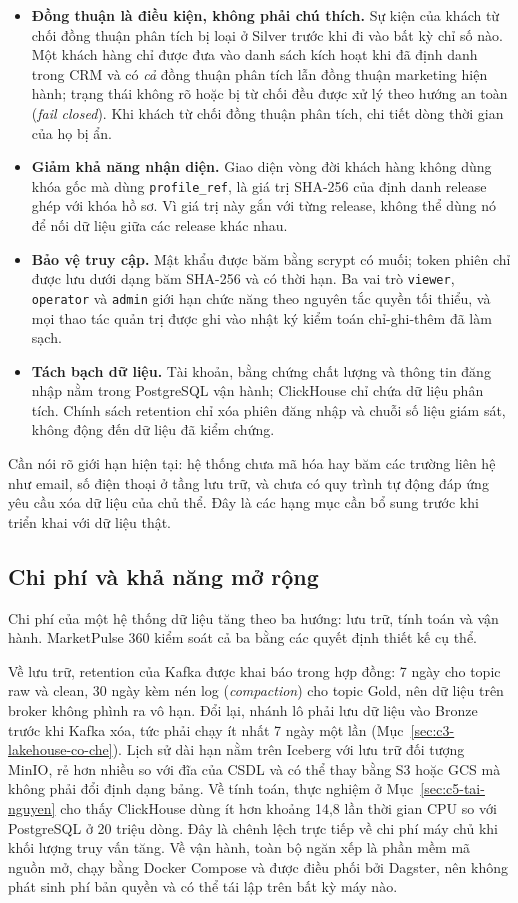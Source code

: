 \begin{itemize}
    \item \textbf{Đồng thuận là điều kiện, không phải chú thích.} Sự kiện của khách từ chối đồng thuận phân tích bị loại ở Silver trước khi đi vào bất kỳ chỉ số nào. Một khách hàng chỉ được đưa vào danh sách kích hoạt khi đã định danh trong CRM và có \emph{cả} đồng thuận phân tích lẫn đồng thuận marketing hiện hành; trạng thái không rõ hoặc bị từ chối đều được xử lý theo hướng an toàn (\emph{fail closed}). Khi khách từ chối đồng thuận phân tích, chi tiết dòng thời gian của họ bị ẩn.
    \item \textbf{Giảm khả năng nhận diện.} Giao diện vòng đời khách hàng không dùng khóa gốc mà dùng \texttt{profile\_ref}, là giá trị SHA-256 của định danh release ghép với khóa hồ sơ. Vì giá trị này gắn với từng release, không thể dùng nó để nối dữ liệu giữa các release khác nhau.
    \item \textbf{Bảo vệ truy cập.} Mật khẩu được băm bằng scrypt có muối; token phiên chỉ được lưu dưới dạng băm SHA-256 và có thời hạn. Ba vai trò \texttt{viewer}, \texttt{operator} và \texttt{admin} giới hạn chức năng theo nguyên tắc quyền tối thiểu, và mọi thao tác quản trị được ghi vào nhật ký kiểm toán chỉ-ghi-thêm đã làm sạch.
    \item \textbf{Tách bạch dữ liệu.} Tài khoản, bằng chứng chất lượng và thông tin đăng nhập nằm trong PostgreSQL vận hành; ClickHouse chỉ chứa dữ liệu phân tích. Chính sách retention chỉ xóa phiên đăng nhập và chuỗi số liệu giám sát, không động đến dữ liệu đã kiểm chứng.
\end{itemize}

Cần nói rõ giới hạn hiện tại: hệ thống chưa mã hóa hay băm các trường liên hệ như email, số điện thoại ở tầng lưu trữ, và chưa có quy trình tự động đáp ứng yêu cầu xóa dữ liệu của chủ thể. Đây là các hạng mục cần bổ sung trước khi triển khai với dữ liệu thật.

\subsection{Chi phí và khả năng mở rộng}
\label{sec:c6-cost}
Chi phí của một hệ thống dữ liệu tăng theo ba hướng: lưu trữ, tính toán và vận hành. MarketPulse 360 kiểm soát cả ba bằng các quyết định thiết kế cụ thể.

Về lưu trữ, retention của Kafka được khai báo trong hợp đồng: 7 ngày cho topic raw và clean, 30 ngày kèm nén log (\emph{compaction}) cho topic Gold, nên dữ liệu trên broker không phình ra vô hạn. Đổi lại, nhánh lô phải lưu dữ liệu vào Bronze trước khi Kafka xóa, tức phải chạy ít nhất 7 ngày một lần (Mục~\ref{sec:c3-lakehouse-co-che}). Lịch sử dài hạn nằm trên Iceberg với lưu trữ đối tượng MinIO, rẻ hơn nhiều so với đĩa của CSDL và có thể thay bằng S3 hoặc GCS mà không phải đổi định dạng bảng. Về tính toán, thực nghiệm ở Mục~\ref{sec:c5-tai-nguyen} cho thấy ClickHouse dùng ít hơn khoảng 14,8 lần thời gian CPU so với PostgreSQL ở 20 triệu dòng. Đây là chênh lệch trực tiếp về chi phí máy chủ khi khối lượng truy vấn tăng. Về vận hành, toàn bộ ngăn xếp là phần mềm mã nguồn mở, chạy bằng Docker Compose và được điều phối bởi Dagster, nên không phát sinh phí bản quyền và có thể tái lập trên bất kỳ máy nào.

